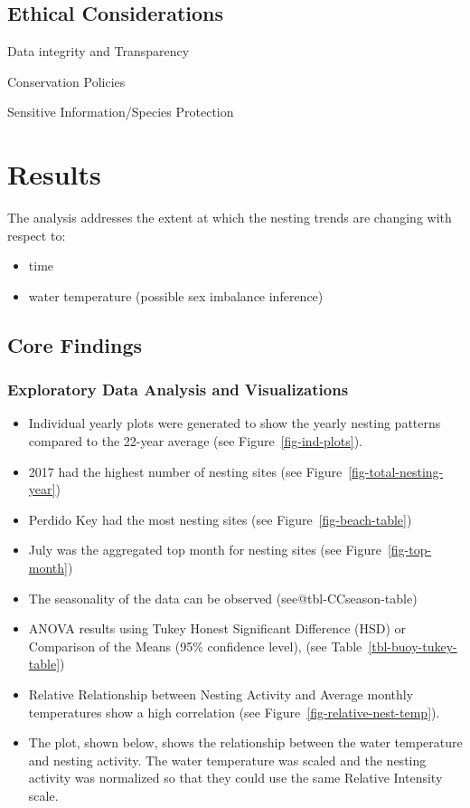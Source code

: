 \documentclass[
  letterpaper,
  DIV=11,
  numbers=noendperiod]{scrartcl}
\providecommand{\tightlist}{%
  \setlength{\itemsep}{0pt}\setlength{\parskip}{0pt}}\usepackage{longtable,booktabs,array}
\begin{document}
\subsection{Ethical Considerations}\label{ethical-considerations}

Data integrity and Transparency

Conservation Policies

Sensitive Information/Species Protection

\section{Results}\label{results}

The analysis addresses the extent at which the nesting trends are
changing with respect to:

\begin{itemize}
\tightlist
\item
  time
\item
  water temperature (possible sex imbalance inference)
\end{itemize}

\subsection{Core Findings}\label{core-findings}

\subsubsection{Exploratory Data Analysis and
Visualizations}\label{exploratory-data-analysis-and-visualizations-1}

\begin{itemize}
\item
  Individual yearly plots were generated to show the yearly nesting
  patterns compared to the 22-year average (see
  Figure~\ref{fig-ind-plots}).
\item
  2017 had the highest number of nesting sites (see
  Figure~\ref{fig-total-nesting-year})
\item
  Perdido Key had the most nesting sites (see
  Figure~\ref{fig-beach-table})
\item
  July was the aggregated top month for nesting sites (see
  Figure~\ref{fig-top-month})
\item
  The seasonality of the data can be observed (see@tbl-CCseason-table)
\item
  ANOVA results using Tukey Honest Significant Difference (HSD) or
  Comparison of the Means (95\% confidence level), (see
  Table~\ref{tbl-buoy-tukey-table})
\item
  Relative Relationship between Nesting Activity and Average monthly
  temperatures show a high correlation (see
  Figure~\ref{fig-relative-nest-temp}).
\item
  The plot, shown below, shows the relationship between the water
  temperature and nesting activity. The water temperature was scaled and
  the nesting activity was normalized so that they could use the same
  Relative Intensity scale.
\end{itemize}
\end{document}
